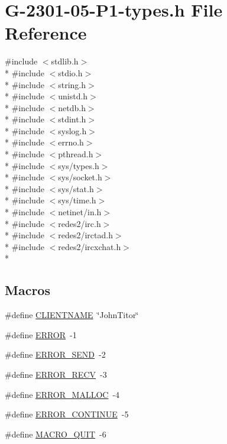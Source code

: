 \hypertarget{_g-2301-05-_p1-types_8h}{\section{G-\/2301-\/05-\/\-P1-\/types.h File Reference}
\label{_g-2301-05-_p1-types_8h}
}
{\ttfamily \#include $<$stdlib.\-h$>$}\\*
{\ttfamily \#include $<$stdio.\-h$>$}\\*
{\ttfamily \#include $<$string.\-h$>$}\\*
{\ttfamily \#include $<$unistd.\-h$>$}\\*
{\ttfamily \#include $<$netdb.\-h$>$}\\*
{\ttfamily \#include $<$stdint.\-h$>$}\\*
{\ttfamily \#include $<$syslog.\-h$>$}\\*
{\ttfamily \#include $<$errno.\-h$>$}\\*
{\ttfamily \#include $<$pthread.\-h$>$}\\*
{\ttfamily \#include $<$sys/types.\-h$>$}\\*
{\ttfamily \#include $<$sys/socket.\-h$>$}\\*
{\ttfamily \#include $<$sys/stat.\-h$>$}\\*
{\ttfamily \#include $<$sys/time.\-h$>$}\\*
{\ttfamily \#include $<$netinet/in.\-h$>$}\\*
{\ttfamily \#include $<$redes2/irc.\-h$>$}\\*
{\ttfamily \#include $<$redes2/irctad.\-h$>$}\\*
{\ttfamily \#include $<$redes2/ircxchat.\-h$>$}\\*
\subsection*{Macros}
\begin{DoxyCompactItemize}
\item 
\#define \hyperlink{_g-2301-05-_p1-types_8h_adcbfe6360d17dafe707c6e9c28ed93e8}{C\-L\-I\-E\-N\-T\-N\-A\-M\-E}~\char`\"{}John\-Titor\char`\"{}
\item 
\#define \hyperlink{_g-2301-05-_p1-types_8h_a8fe83ac76edc595f6b98cd4a4127aed5}{E\-R\-R\-O\-R}~-\/1
\item 
\#define \hyperlink{_g-2301-05-_p1-types_8h_ab8fafef46c1444f11a84a7d2fdeef171}{E\-R\-R\-O\-R\-\_\-\-S\-E\-N\-D}~-\/2
\item 
\#define \hyperlink{_g-2301-05-_p1-types_8h_a22a59fb7c80bce4f0cc84db66d59c0b6}{E\-R\-R\-O\-R\-\_\-\-R\-E\-C\-V}~-\/3
\item 
\#define \hyperlink{_g-2301-05-_p1-types_8h_a1d14efe4782914b2a1825af2608490f9}{E\-R\-R\-O\-R\-\_\-\-M\-A\-L\-L\-O\-C}~-\/4
\item 
\#define \hyperlink{_g-2301-05-_p1-types_8h_aac15417c9e9b175879f9621525227de1}{E\-R\-R\-O\-R\-\_\-\-C\-O\-N\-T\-I\-N\-U\-E}~-\/5
\item 
\#define \hyperlink{_g-2301-05-_p1-types_8h_a7b3b976361d315b1cfa56d14dc5c0a5c}{M\-A\-C\-R\-O\-\_\-\-Q\-U\-I\-T}~-\/6
\end{DoxyCompactItemize}


